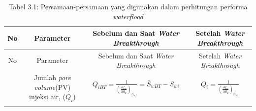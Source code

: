 \documentclass[
]{book}
\begin{document}
\begin{longtable}[]{@{}cccc@{}}
\caption{{ Tabel 3.1: Persamaan-persamaan yang digunakan dalam perhitungan performa \emph{waterflood} }}\tabularnewline
\toprule
\begin{minipage}[b]{0.22\columnwidth}\centering
No\strut
\end{minipage} & \begin{minipage}[b]{0.22\columnwidth}\centering
Parameter\strut
\end{minipage} & \begin{minipage}[b]{0.22\columnwidth}\centering
Sebelum dan Saat \emph{Water Breakthrough}\strut
\end{minipage} & \begin{minipage}[b]{0.22\columnwidth}\centering
Setelah \emph{Water Breakthrough}\strut
\end{minipage}\tabularnewline
\midrule
\endfirsthead
\toprule
\begin{minipage}[b]{0.22\columnwidth}\centering
No\strut
\end{minipage} & \begin{minipage}[b]{0.22\columnwidth}\centering
Parameter\strut
\end{minipage} & \begin{minipage}[b]{0.22\columnwidth}\centering
Sebelum dan Saat \emph{Water Breakthrough}\strut
\end{minipage} & \begin{minipage}[b]{0.22\columnwidth}\centering
Setelah \emph{Water Breakthrough}\strut
\end{minipage}\tabularnewline
\midrule
\endhead
\begin{minipage}[t]{0.22\columnwidth}\centering
1\strut
\end{minipage} & \begin{minipage}[t]{0.22\columnwidth}\centering
Jumlah \emph{pore volume}(PV) injeksi air, (\(Q_i\))\strut
\end{minipage} & \begin{minipage}[t]{0.22\columnwidth}\centering
\(Q_{iBT}=\frac{1}{\left( \frac{\partial f_w}{\partial S_w} \right)_{S_{wf}}}=\bar S_{wBT} - S_{wi}\)\strut
\end{minipage} & \begin{minipage}[t]{0.22\columnwidth}\centering
\(Q_i = \frac{1}{\left( \frac{\partial f_w}{\partial S_w} \right)_{S_{w2}}}\)\strut
\end{minipage}\tabularnewline
\begin{minipage}[t]{0.22\columnwidth}\centering

\end{minipage}
\end{longtable}
\end{document}
